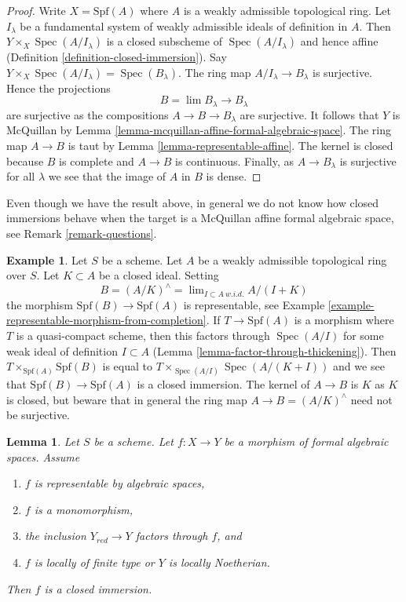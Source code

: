 \documentclass{stacks-project}
\theoremstyle{plain}
\newtheorem{lemma}[subsection]{Lemma}
\theoremstyle{definition}
\newtheorem{example}[subsection]{Example}
\theoremstyle{remark}
\numberwithin{equation}{subsection}
\def\lim{\mathop{\mathrm{lim}}\nolimits}
\def\Spec{\mathop{\mathrm{Spec}}}
\begin{document}
\begin{proof}
Write $X = \text{Spf}(A)$ where $A$ is a weakly admissible topological ring.
Let $I_\lambda$ be a fundamental system of weakly admissible ideals
of definition in $A$. Then $Y \times_X \Spec(A/I_\lambda)$ is
a closed subscheme of $\Spec(A/I_\lambda)$
and hence affine (Definition \ref{definition-closed-immersion}).
Say $Y \times_X \Spec(A/I_\lambda) = \Spec(B_\lambda)$.
The ring map $A/I_\lambda \to B_\lambda$
is surjective. Hence the projections
$$
B = \lim B_\lambda \longrightarrow B_\lambda
$$
are surjective as the compositions $A \to B \to B_\lambda$ are surjective.
It follows that $Y$ is McQuillan by
Lemma \ref{lemma-mcquillan-affine-formal-algebraic-space}.
The ring map $A \to B$ is taut by Lemma \ref{lemma-representable-affine}.
The kernel is closed because $B$ is complete and $A \to B$ is
continuous. Finally, as $A \to B_\lambda$ is surjective for all $\lambda$
we see that the image of $A$ in $B$ is dense.
\end{proof}

\noindent
Even though we have the result above, in general we do not know how
closed immersions behave when the target is a
McQuillan affine formal algebraic space, see Remark \ref{remark-questions}.

\begin{example}
\label{example-closed-immersion-from-quotient}
Let $S$ be a scheme. Let $A$ be a weakly admissible topological ring over $S$.
Let $K \subset A$ be a closed ideal. Setting
$$
B = (A/K)^\wedge = \lim_{I \subset A\ w.i.d.} A/(I + K)
$$
the morphism $\text{Spf}(B) \to \text{Spf}(A)$ is representable, see
Example \ref{example-representable-morphism-from-completion}.
If $T \to \text{Spf}(A)$ is a morphism where $T$ is a quasi-compact
scheme, then this factors through $\Spec(A/I)$ for some weak
ideal of definition $I \subset A$ (Lemma \ref{lemma-factor-through-thickening}).
Then $T \times_{\text{Spf}(A)} \text{Spf}(B)$
is equal to $T \times_{\Spec(A/I)} \Spec(A/(K + I))$ and
we see that $\text{Spf}(B) \to \text{Spf}(A)$ is a closed immersion.
The kernel of $A \to B$ is $K$ as $K$ is closed, but
beware that in general the ring map $A \to B = (A/K)^\wedge$
need not be surjective.
\end{example}

\begin{lemma}
\label{lemma-monomorphism-iso-over-red}
Let $S$ be a scheme. Let $f : X \to Y$ be a morphism of formal algebraic
spaces. Assume
\begin{enumerate}
\item $f$ is representable by algebraic spaces,
\item $f$ is a monomorphism,
\item the inclusion $Y_{red} \to Y$ factors through $f$, and
\item $f$ is locally of finite type or $Y$ is locally Noetherian.
\end{enumerate}
Then $f$ is a closed immersion.
\end{lemma}
\end{document}
